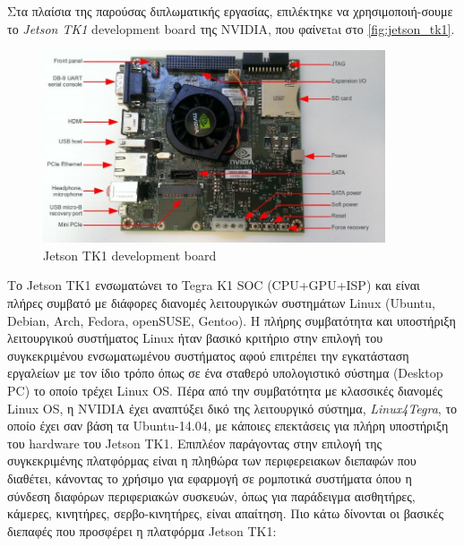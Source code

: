 Στα πλαίσια της παρούσας διπλωματικής εργασίας, επιλέκτηκε να χρησιμοποιή-σουμε το
\emph{Jetson TK1} development board της NVIDIA, που φαίνετaι στο \autoref{fig:jetson_tk1}.
\begin{figure}[!ht]
  \centering
  \includegraphics[width=0.9\textwidth]{./images/chapter4/jetson-tk1-labelled.jpg}
  \caption[Jetson TK1 development board]{Jetson TK1 development board}
  \label{fig:jetson_tk1}
\end{figure}
Το Jetson TK1 ενσωματώνει το Tegra K1 SOC (CPU+GPU+ISP)
και είναι πλήρες συμβατό με διάφορες διανομές λειτουργικών συστημάτων Linux (Ubuntu, Debian, Arch, Fedora, openSUSE, Gentoo).
Η πλήρης συμβατότητα και υποστήριξη λειτουργικού συστήματος Linux ήταν βασικό κριτήριο
στην επιλογή του συγκεκριμένου ενσωματωμένου συστήματος αφού επιτρέπει την
εγκατάσταση εργαλείων με τον ίδιο τρόπο όπως σε ένα σταθερό υπολογιστικό σύστημα (Desktop PC)
το οποίο τρέχει Linux OS. Πέρα από την συμβατότητα με κλασσικές διανομές Linux OS,
η NVIDIA έχει αναπτύξει δικό της λειτουργικό σύστημα, \emph{Linux4Tegra}, το οποίο
έχει σαν βάση τα Ubuntu-14.04, με κάποιες επεκτάσεις για πλήρη υποστήριξη του hardware του Jetson TK1.
Επιπλέον παράγοντας στην επιλογή της συγκεκριμένης πλατφόρμας είναι η πληθώρα των περιφερειακων διεπαφών που
διαθέτει, κάνοντας το χρήσιμο για εφαρμογή σε ρομποτικά συστήματα όπου η σύνδεση διαφόρων περιφεριακών συσκευών,
όπως για παράδειγμα αισθητήρες, κάμερες, κινητήρες, σερβο-κινητήρες, είναι απαίτηση.
Πιο κάτω δίνονται οι βασικές διεπαφές που προσφέρει η πλατφόρμα Jetson TK1:
